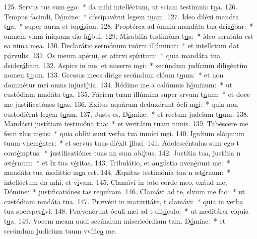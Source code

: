 125. Servus tus sum \uline{e}go:~* da mihi intelléctum, ut sciam testimnia t\uline{u}a.
126. Tempus facindi, D\uline{ó}mine:~* díssipavérnt legem t\uline{u}am.
127. Ideo diléxi mandta t\uline{u}a,~* super aurm et top\uline{á}zion.
128. Proptérea ad ómnia mandáta tua drig\uline{é}bar:~* omnem viam iníquam dio h\uline{á}bui.
129. Mirabília testimóna t\uline{u}a:~* ídeo scrutáta est ea nima m\uline{e}a.
130. Declarátio sermónum tuórm ill\uline{ú}minat:~* et intellctum dat p\uline{á}rvulis.
131. Os meum apérui, et attrxi sp\uline{í}ritum:~* quia mandáta tua dsider\uline{á}bam.
132. Aspice in me, et miserre m\uline{e}i:~* secúndum judícium diligéntim nomen t\uline{u}um.
133. Gressus meos dírige secúndum elóum t\uline{u}um:~* et non dominétur mei omns injust\uline{í}tia.
134. Rédime me a calúmnis h\uline{ó}minum:~* ut custódiam mndáta t\uline{u}a.
135. Fáciem tuam illúmina super srvum t\uline{u}um:~* et doce me justificatónes t\uline{u}as.
136. Exitus aquárum deduxérunt ócli m\uline{e}i:~* quia non custodiérnt legem t\uline{u}am.
137. Justs es, D\uline{ó}mine:~* et rectum judcium t\uline{u}um.
138. Mandásti justítiam testimóna t\uline{u}a:~* et veritátm tuam n\uline{i}mis.
139. Tabéscere me fecit zlus m\uline{e}us:~* quia oblíti sunt verba tua inmíci m\uline{e}i.
140. Ignítum elóquium tuum vhem\uline{é}nter:~* et servus tuus dléxit \uline{i}llud.
141. Adolescéntulus sum ego t cont\uline{é}mptus:~* justificatiónes tuas nn sum obl\uline{í}tus.
142. Justítia tua, justítia n æt\uline{é}rnum:~* et lx tua v\uline{é}ritas.
143. Tribulátio, et angústia nven\uline{é}runt me:~* mandáta tua medittio m\uline{e}a est.
144. Æquitas testimónia tua n æt\uline{é}rnum:~* intelléctum da mhi, et v\uline{i}vam.
145. Clamávi in toto corde meo, exáud me, D\uline{ó}mine:~* justificatiónes tas re\uline{quí}ram.
146. Clamávi ad te, slvum m\uline{e} fac:~* ut custódiam mndáta t\uline{u}a.
147. Prævéni in maturitáte, t clam\uline{á}vi:~* quia in verba tua spersper\uline{á}vi.
148. Prævenérunt óculi mei ad t dil\uline{ú}culo:~* ut meditárer elquia t\uline{u}a.
149. Vocem meam audi secúndum misericórdiam tam, D\uline{ó}mine:~* et secúndum judícium tuum vvífic\uline{a} me.
